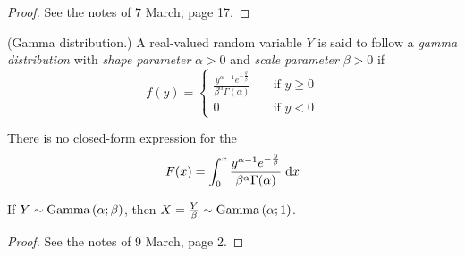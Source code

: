 \documentclass[11pt]{article}
\begin{document}
\begin{proof}
    See the notes of 7 March, page 17.
\end{proof}

\begin{defn}{(Gamma distribution.)}
    \label{def:gamma-distribution}
    A real-valued random variable $Y$
    is said to follow a \emph{gamma distribution}
    with \emph{shape parameter} $\alpha > 0$
    and \emph{scale parameter} $\beta > 0$
    if
    \begin{equation}
        \label{eq:gamma-distribution}
        f(y) = \begin{cases}
            \frac{
                y^{\alpha - 1} e^{-\frac{y}{\beta}}
            }{
                \beta^\alpha \Gamma(\alpha)
            }
                &\quad\text{if } y \geq 0
            \\
            0
                &\quad\text{if } y < 0
        \end{cases}
    \end{equation}
\end{defn}

\begin{rem}
    There is no closed-form expression for the \cdf{}
    \begin{equation*}
        F(x)
        = \int_0^x \frac{
            y^{\alpha - 1} e^{-\frac{y}{\beta}}
        }{
            \beta^\alpha \Gamma(\alpha)
        }
        \;\mathrm{d} x
    \end{equation*}
\end{rem}

\begin{thm}
    If $Y \sim \operatorname{Gamma}\left(\alpha;\beta\right)$,
    then $X = \frac{Y}{\beta} \sim \operatorname{Gamma}\left(\alpha;1\right)$.
\end{thm}

\begin{proof}
    See the notes of 9 March, page 2.
\end{proof}
\end{document}
